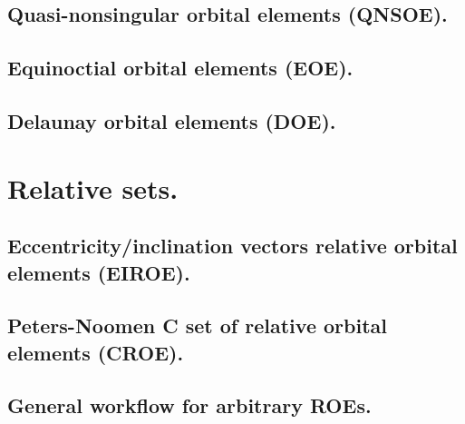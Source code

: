 	\subsection{Quasi-nonsingular orbital elements (QNSOE).}
	\subsection{Equinoctial orbital elements (EOE).}
	\subsection{Delaunay orbital elements (DOE).}
%
\section{Relative sets.}
%
%
	\subsection{Eccentricity/inclination vectors relative orbital elements (EIROE).}
	\subsection{Peters-Noomen C set of relative orbital elements (CROE).}
	\subsection{General workflow for arbitrary ROEs.}
%